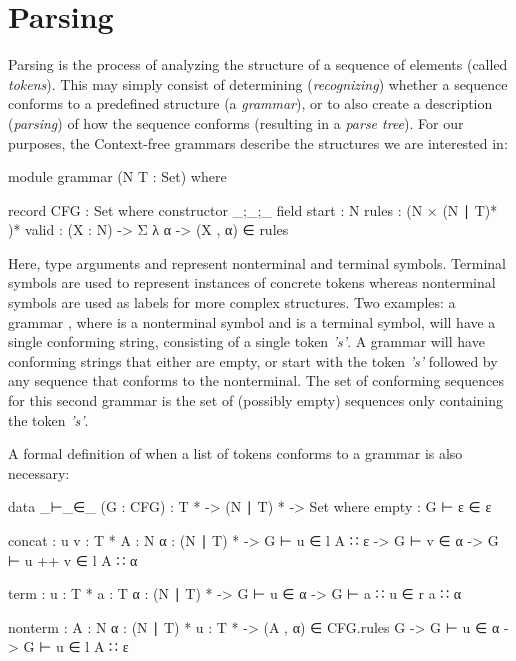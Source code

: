 \chapter{Parsing}

	Parsing is the process of analyzing the structure of a sequence of elements
	(called \emph{tokens}). This may simply consist of determining
	(\emph{recognizing}) whether a sequence conforms to a predefined structure
	(a \emph{grammar}), or to also create a description (\emph{parsing}) of how
	the sequence conforms (resulting in a \emph{parse tree}). For our
	purposes, the Context-free grammars describe the structures we are
	interested in:
	
	\begin{code}

		module grammar (N T : Set) where

		record CFG : Set where
		  constructor _;_;_
		  field
		    start : N
		    rules : (N × (N ∣ T)* )*
    		valid : (X : N) -> Σ λ α -> (X , α) ∈ rules

	\end{code}

	Here, type arguments  and  represent nonterminal and
	terminal symbols. Terminal symbols are used to represent instances of
	concrete tokens whereas nonterminal symbols are used as labels for more
	complex structures. Two examples: a grammar , where  is a nonterminal symbol and  is a
	terminal symbol, will have a single conforming string, consisting of a
	single token \emph{'s'}. A grammar  will have conforming strings that either are empty, or start
	with the token \emph{'s'} followed by any sequence that conforms to the
	 nonterminal. The set of conforming sequences for this second
	grammar is the set of (possibly empty) sequences only containing the token
	\emph{'s'}.

	A formal definition of when a list of tokens conforms to a grammar is also
	necessary:

	\begin{code}
	
		data _⊢_∈_ (G : CFG) :  T * -> (N ∣ T) * -> Set where
		  empty :
		    G ⊢ ε ∈ ε
		
		  concat : {u v : T *} {A : N} {α : (N ∣ T) *} ->
		    G ⊢ u ∈ l A ∷ ε -> G ⊢ v ∈ α -> G ⊢ u ++ v ∈ l A ∷ α
		
		  term : {u : T *} {a : T} {α : (N ∣ T) *} ->
		    G ⊢ u ∈ α -> G ⊢ a ∷ u ∈ r a ∷ α
		
		  nonterm : {A : N} {α : (N ∣ T) *} {u : T *} ->
		    (A , α) ∈ CFG.rules G -> G ⊢ u ∈ α -> G ⊢ u ∈ l A ∷ ε

	\end{code}

